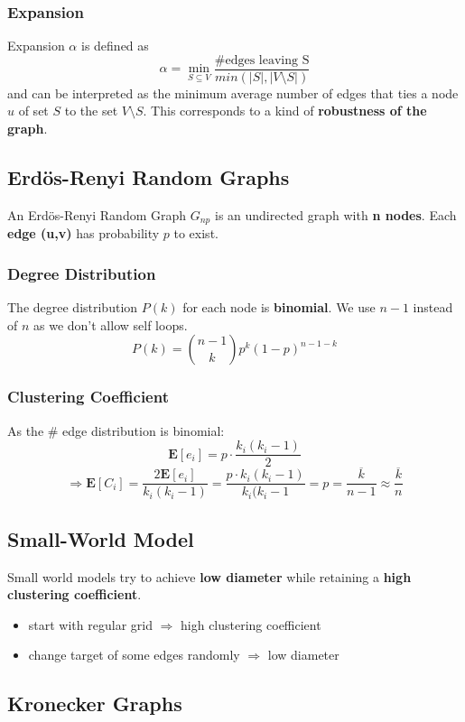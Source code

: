 \documentclass[parskip=full]{scrartcl}
\begin{document}
\subsubsection{Expansion}
Expansion $\alpha$ is defined as
\[\alpha = \min_{S \subseteq V}\frac{\text{\#edges leaving S}}{min(\vert S \vert, \vert V \setminus S \vert)}\]
and can be interpreted as the minimum average number of edges that ties a node $u$ of set $S$ to the set $V \setminus S$. This corresponds to a kind of \textbf{robustness of the graph}.

\subsection{Erdös-Renyi Random Graphs}
An Erdös-Renyi Random Graph \textbf{$G_{np}$} is an undirected graph with \textbf{n nodes}. Each \textbf{edge (u,v)} has probability \textbf{$p$} to exist.

\subsubsection{Degree Distribution}
The degree distribution \textbf{$P(k)$} for each node is \textbf{binomial}. We use $n-1$ instead of $n$ as we don't allow self loops.
\[P(k) = \binom{n-1}{k}p^k(1-p)^{n-1-k}\]

\subsubsection{Clustering Coefficient}
As the \# edge distribution is binomial:
\[\mathbf{E}[e_i] = p \cdot \frac{k_i(k_i - 1)}{2}\]
\[\Longrightarrow \mathbf{E}[C_i] = \frac{2\mathbf{E}[e_i]}{k_i(k_i-1)} = \frac{p \cdot k_i(k_i-1)}{k_i(k_i-1} = p = \frac{\overline{k}}{n-1} \approx \frac{\overline{k}}{n}\]

\subsection{Small-World Model}
Small world models try to achieve \textbf{low diameter} while retaining a \textbf{high clustering coefficient}.
\begin{itemize}
	\item start with regular grid $\Rightarrow$ high clustering coefficient
	\item change target of some edges randomly $\Rightarrow$ low diameter
\end{itemize}

\subsection{Kronecker Graphs}
\end{document}
